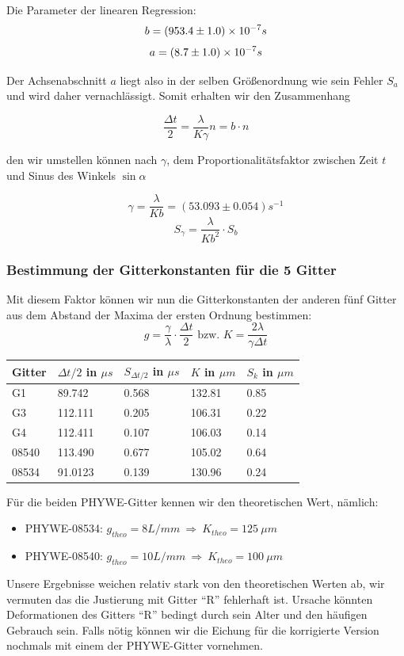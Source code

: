 Die Parameter der linearen Regression:
$$ b               = (953.4 \pm 1.0)\times 10^{-7} s $$
$$ a               = (8.7 \pm 1.0)\times 10^{-7} s $$

Der Achsenabschnitt $a$ liegt also in der selben Größenordnung wie sein Fehler $S_a$ und wird daher vernachlässigt. Somit erhalten wir den Zusammenhang

$$\frac{\Delta t}{2} = \frac{\lambda}{K\gamma}n = b\cdot n$$

den wir umstellen können nach $\gamma$, dem Proportionalitätsfaktor zwischen Zeit $t$ und Sinus des Winkels $\sin \alpha$ 

$$ \gamma = \frac{\lambda}{Kb} = (53.093 \pm 0.054) s^{-1} $$
$$S_{\gamma} = \frac{\lambda}{Kb^2} \cdot S_b $$


\subsubsection{Bestimmung der Gitterkonstanten f\"ur die 5 Gitter}

Mit diesem Faktor können wir nun die Gitterkonstanten der anderen fünf Gitter aus dem Abstand der Maxima der ersten Ordnung bestimmen:
$$ g = \frac{\gamma}{\lambda}\cdot \frac{\Delta t}{2} \text{ bzw. } K = \frac{2 \lambda }{\gamma \Delta t} $$
\begin{center}
\begin{tabular}{lllll}
\toprule 
Gitter & $\Delta t /2$ in $\mu s$ & $S_{\Delta t /2}$ in $\mu s$ & $K$ in $\mu m$ & $S_k$ in $\mu m$\\
\midrule
G1 & 89.742 & 0.568 & 132.81 & 0.85\\
G3 & 112.111 & 0.205 & 106.31 & 0.22\\
G4 & 112.411 & 0.107 & 106.03 & 0.14\\
08540 & 113.490 & 0.677 & 105.02 & 0.64\\
08534 & 91.0123 & 0.139 & 130.96 & 0.24\\
\bottomrule
\end{tabular} 
\end{center}

F\"ur die beiden PHYWE-Gitter kennen wir den theoretischen Wert, n\"amlich: 
\begin{itemize}
\item PHYWE-08534: $g_{theo} = 8 L/mm\ \Rightarrow \ K_{theo} = 125 \ \mu m$
\item PHYWE-08540: $g_{theo} = 10 L/mm\ \Rightarrow \ K_{theo} = 100 \ \mu m$
\end{itemize} 
Unsere Ergebnisse weichen relativ stark von den theoretischen Werten ab, wir vermuten das die Justierung mit Gitter ``R'' fehlerhaft ist. Ursache könnten Deformationen des Gitters ``R'' bedingt durch sein Alter und den häufigen Gebrauch sein. Falls nötig können wir die Eichung für die korrigierte Version nochmals mit einem der PHYWE-Gitter vornehmen.

